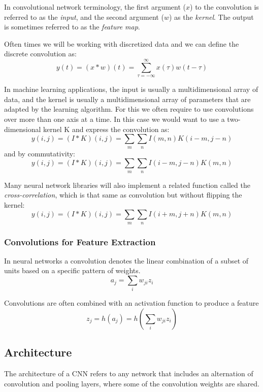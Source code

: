 \documentclass[12pt]{article}
\begin{document}
        In convolutional network terminology, the first argument ($x$) to the convolution is referred to as the \textit{input},
        and the second argument ($w$) as the \textit{kernel}. The output is sometimes referred to as the \textit{feature
        map}.

        Often times we will be working with discretized data and we can define the discrete convolution as:
        $$ y(t) = (x * w)(t) = \sum_{\tau = -\infty}^{\infty} x(\tau)w(t-\tau) $$

        In machine learning applications, the input is usually a multidimensional array of data, and the kernel is
        usually a multidimensional array of parameters that are adapted by the learning algorithm. For this we often
        require to use convolutions over more than one axis at a time. In this case we would want to use a
        two-dimensional kernel K and express the convolution as:
        $$ y(i,j) = (I * K)(i,j) = \sum_m \sum_n I(m, n)K(i-m,j-n) $$
        and by commutativity:
        $$ y(i,j) = (I * K)(i,j) = \sum_m \sum_n I(i-m, j-n)K(m,n) $$

        Many neural network libraries will also implement a related function called the \textit{cross-correlation},
        which is that same as convolution but without flipping the kernel:
        $$ y(i,j) = (I * K)(i,j) = \sum_m \sum_n I(i+m, j+n)K(m,n) $$
    
        \subsubsection{Convolutions for Feature Extraction}
            In neural networks a convolution denotes the linear combination of a subset of units based on a specific
            pattern of weights. 
            $$ a_j = \sum_i w_{ji}z_i $$

            Convolutions are often combined with an activation function to produce a feature
            $$ z_j = h(a_j) = h(\sum_i w_{ji}z_i) $$
    
    \subsection{Architecture}
        The architecture of a CNN refers to any network that includes an alternation of convolution and pooling layers,
        where some of the convolution weights are shared.
                
\end{document}

